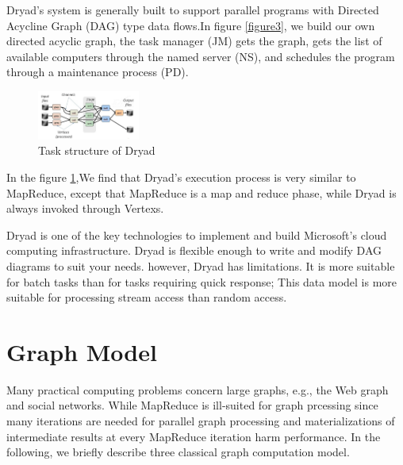 \documentclass[journal]{IEEEtran}
\begin{document}
Dryad's system is generally built to support parallel programs with Directed Acycline Graph (DAG) type data flows.In figure \ref{figure3}, we build our own directed acyclic graph, the task manager (JM) gets the graph, gets the list of available computers through the named server (NS), and schedules the program through a maintenance process (PD).
\begin{figure}
	\centering
	\includegraphics[width = 0.3\textwidth]{5.png}
	\centering
	\caption{Task structure of Dryad }
	\label{levfig}
\end{figure} 

In the figure \ref{levfig},We find that Dryad's execution process is very similar to MapReduce, except that MapReduce is a map and reduce phase, while Dryad is always invoked through Vertexs.

Dryad is one of the key technologies to implement and build Microsoft's cloud computing infrastructure. Dryad is flexible enough to write and modify DAG diagrams to suit your needs.
however, Dryad has limitations. It is more suitable for batch tasks than for tasks requiring quick response; This data model is more suitable for processing stream access than random access.


\section{Graph Model}
Many practical computing problems concern large graphs, e.g., the Web graph and social networks. While MapReduce is ill-suited for graph prcessing since many iterations are needed for parallel graph processing and materializations of intermediate results at every MapReduce iteration harm performance. In the following, we briefly describe three classical graph computation model.
\end{document}
